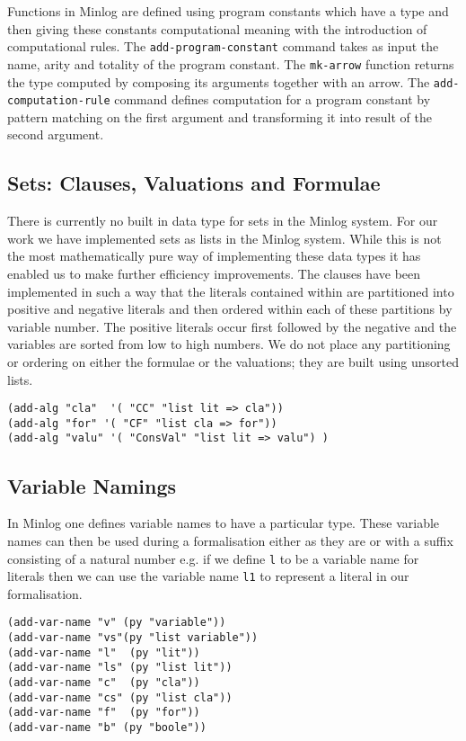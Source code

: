 Functions in Minlog are defined using program constants which have a type and then giving these constants computational meaning with the introduction of computational rules. The \texttt{add-program-constant} command takes as input the name, arity and totality of the program constant. The \texttt{mk-arrow} function returns the type computed by composing its arguments together with an arrow. The \texttt{add-computation-rule} command defines computation for a program constant by pattern matching on the first argument and transforming it into result of the second argument.


\subsection*{Sets: Clauses, Valuations and Formulae}
There is currently no built in data type for sets in the Minlog system. For our work we have implemented sets as lists in the Minlog system. While this is not the most mathematically pure way of implementing these data types it has enabled us to make further efficiency improvements. The clauses have been implemented in such a way that the literals contained within are partitioned into positive and negative literals and then ordered within each of these partitions by variable number. The positive literals occur first followed by the negative and the variables are sorted from low to high numbers. We do not place any partitioning or ordering on either the formulae or the valuations; they are built using unsorted lists.

\begin{lstlisting}[caption = "Definitions of clauses\, formulae and valuations in the Minlog system"]
(add-alg "cla"  '( "CC" "list lit => cla"))
(add-alg "for" '( "CF" "list cla => for"))
(add-alg "valu" '( "ConsVal" "list lit => valu") )
\end{lstlisting}

\subsection*{Variable Namings}
In Minlog one defines variable names to have a particular type.  These variable names can then be used during a formalisation either as they are or with a suffix consisting of a natural number e.g. if we define \texttt{l} to be a variable name for literals then we can use the variable name \texttt{l1} to represent a literal in our formalisation.

\begin{lstlisting}[caption = "Variable namings for the DPLL formalisation in Minlog"]
(add-var-name "v" (py "variable"))
(add-var-name "vs"(py "list variable"))
(add-var-name "l"  (py "lit"))
(add-var-name "ls" (py "list lit"))
(add-var-name "c"  (py "cla"))
(add-var-name "cs" (py "list cla"))
(add-var-name "f"  (py "for"))
(add-var-name "b" (py "boole"))
\end{lstlisting}


